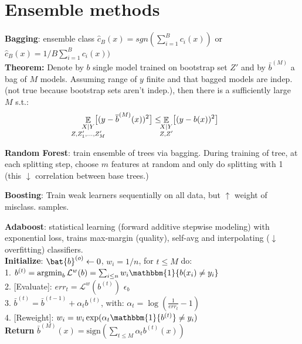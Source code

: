 \section{Ensemble methods}

\textbf{Bagging}:
ensemble class $\hat{c}_B(x)=sgn(\sum_{i=1}^{B} c_i(x))$ or $\hat{c}_B(x)=1/B\sum_{i=1}^{B} c_i(x))$\\

\textbf{Theorem:} Denote by $b$ single model trained on bootstrap set $Z'$ and by $\bar{b}^{(M)}$ a bag of $M$ models. Assuming range of $y$ finite and that bagged models are indep. (not true because bootstrap sets aren't indep.), then there is a sufficiently large $M$ s.t.:
$$
\mathop{\mathbb{E}}_{\mathclap{\substack{X|Y \\ Z, Z'_1, \ldots, Z'_M}}}\;
\big[ (y - \bar{b}^{(M)}(x))^2 \big]
\leq
\mathop{\mathbb{E}}_{\mathclap{\substack{X|Y \\ Z,Z'}}}\;
\big[ (y - b(x))^2 \big]
$$

\textbf{Random Forest}: train ensemble of trees via bagging. During training of tree, at each splitting step, choose $m$ features at random and only do splitting with 1 (this $\downarrow$ correlation between base trees.)

\textbf{Boosting}: Train weak learners sequentially on all data, but $\uparrow$ weight of misclass. samples.

\textbf{Adaboost}: statistical learning (forward additive stepwise modeling) with exponential loss, trains max-margin (quality), self-avg and interpolating ($\downarrow$ overfitting) classifiers.\\
\textbf{Initialize}: $\bat{b}^{(o)}\leftarrow 0$, $w_i = 1/n$, for $t\leq M$ do:\\
1. $b^{(t)}=\argmin_b \mathcal{L}^w(b)=\sum_{i\leq n}w_i\mathbbm{1}\{b(x_i)\neq y_i\}$\\
2. [Evaluate]: $err_t = \mathcal{L}^w(b^{(t)})$ $\epsilon_b$\\
3. $\bar b^{(t)}=\bar b^{(t-1)}+\alpha_t b^{(t)}$, with: $\alpha_t=\log(\frac{1}{err_t}-1)$\\
4. [Reweight]: $w_i = w_i \exp(\alpha_t \mathbbm{1}\{b^{(t)}\}\not = y_i)$\\
\textbf{Return} $\bar b^{(M)}(x) = \text{sign} \left ( \sum_{t\leq M} \alpha_t b^{(t)}(x) \right )$\\



